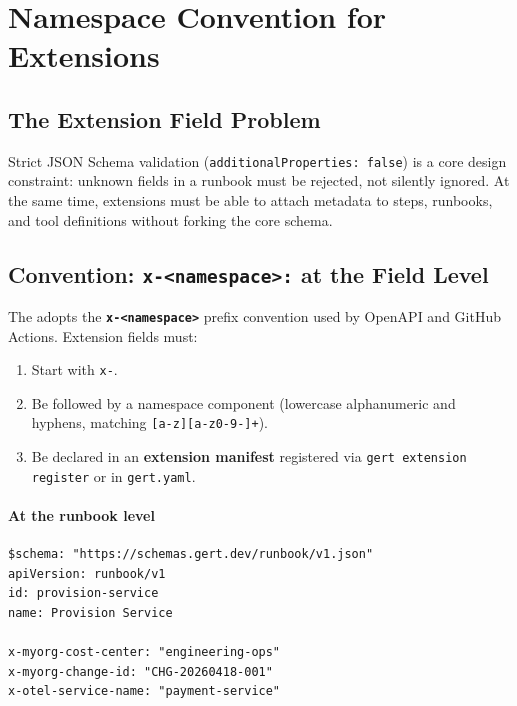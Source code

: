 \section{Namespace Convention for Extensions}
\label{sec:namespaces}

\subsection{The Extension Field Problem}

Strict JSON Schema validation (\texttt{additionalProperties: false}) is a core
design constraint: unknown fields in a runbook must be rejected, not silently
ignored.  At the same time, extensions must be able to attach metadata to steps,
runbooks, and tool definitions without forking the core schema.

\subsection{Convention: \texttt{x-<namespace>:} at the Field Level}

The adopts the \textbf{\texttt{x-<namespace>}} prefix convention used by OpenAPI
and GitHub Actions.  Extension fields must:

\begin{enumerate}
  \item Start with \texttt{x-}.
  \item Be followed by a namespace component (lowercase alphanumeric and hyphens,
        matching \texttt{[a-z][a-z0-9-]+}).
  \item Be declared in an \textbf{extension manifest} registered via
        \texttt{gert extension register} or in \texttt{gert.yaml}.
\end{enumerate}

\paragraph{At the runbook level}

\begin{verbatim}
$schema: "https://schemas.gert.dev/runbook/v1.json"
apiVersion: runbook/v1
id: provision-service
name: Provision Service

x-myorg-cost-center: "engineering-ops"
x-myorg-change-id: "CHG-20260418-001"
x-otel-service-name: "payment-service"
\end{verbatim}

